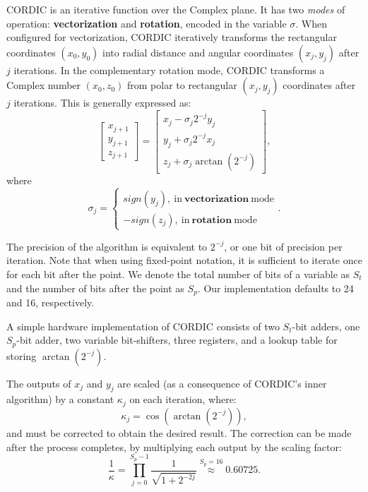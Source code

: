 CORDIC is an iterative function over the Complex plane. It has two \textit{modes} of operation: \textbf{vectorization} and \textbf{rotation}, encoded in the variable $\sigma$. When configured for vectorization, CORDIC iteratively transforms the rectangular coordinates $(x_0,y_0)$ into radial distance and angular coordinates $(x_j,y_j)$ after $j$ iterations. In the complementary rotation mode, CORDIC transforms a Complex number $(x_0,z_0)$ from polar to rectangular $(x_j,y_j)$ coordinates after $j$ iterations. This is generally expressed as:
%
\begin{equation*}
  \begin{bmatrix}
    x_{j+1} \\
    y_{j+1} \\
    z_{j+1}
  \end{bmatrix}
  =
  \begin{bmatrix}
    x_{j} - \sigma_{j}2^{-j}y_{j} \\
    y_{j} + \sigma_{j}2^{-j}x_{j} \\
    z_{j} + \sigma_{j}\arctan(2^{-j})
  \end{bmatrix},
\end{equation*}
%
where
%
\begin{equation}
  \sigma_j = 
  \begin{cases}
    sign(y_j),~\text{in}~\textbf{vectorization}~\text{mode} \\
    -sign(z_j),~\text{in}~\textbf{rotation}~\text{mode}
  \end{cases}.
\end{equation}


The precision of the algorithm is equivalent to $2^{-j}$, or one bit of precision per iteration. Note that when using fixed-point notation, it is sufficient to iterate once for each bit after the point. We denote the total number of bits of a variable as $S_t$ and the number of bits after the point as $S_p$. Our implementation defaults to 24 and 16, respectively.

A simple hardware implementation of CORDIC consists of two $S_t$-bit adders, one $S_p$-bit adder, two variable bit-shifters, three registers, and a lookup table for storing $\arctan(2^{-j})$.

The outputs of $x_j$ and $y_j$ are scaled (as a consequence of CORDIC's inner algorithm) by a constant $\kappa_j$ on each iteration, where:
%
\begin{equation*}
  \kappa_j = \cos(\arctan(2^{-j})),
\end{equation*}
%
and must be corrected to obtain the desired result. The correction can be made after the process completes, by multiplying each output by the scaling factor:
%
\begin{equation}
  \frac{1}{\kappa} = \prod_{j=0}^{S_p-1}{\frac{1}{\sqrt{1+2^{-2j}}}} \stackrel{S_p=16}{\approx} 0.60725.
\end{equation}

